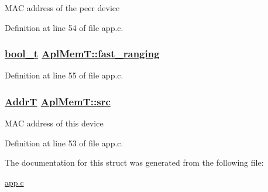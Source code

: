 MAC address of the peer device 

Definition at line 54 of file app.c.\hypertarget{structAplMemT_5d70a5712537b9865b5f0820e4f856b8}{
\subsubsection[fast\_\-ranging]{\setlength{\rightskip}{0pt plus 5cm}\hyperlink{ntrxtypes_8h_04dd5074964518403bf944f2b240a5f8}{bool\_\-t} \hyperlink{structAplMemT_5d70a5712537b9865b5f0820e4f856b8}{Apl\-Mem\-T::fast\_\-ranging}}}
\label{structAplMemT_5d70a5712537b9865b5f0820e4f856b8}




Definition at line 55 of file app.c.\hypertarget{structAplMemT_df06b4a705d3ec9ebaf7a9cb2d3c3fff}{
\subsubsection[src]{\setlength{\rightskip}{0pt plus 5cm}\hyperlink{ntrxtypes_8h_9763ea343e88d0129a49347a4b2ff676}{Addr\-T} \hyperlink{structAplMemT_df06b4a705d3ec9ebaf7a9cb2d3c3fff}{Apl\-Mem\-T::src}}}
\label{structAplMemT_df06b4a705d3ec9ebaf7a9cb2d3c3fff}


MAC address of this device 

Definition at line 53 of file app.c.

The documentation for this struct was generated from the following file:\begin{CompactItemize}
\item 
\hyperlink{app_8c}{app.c}\end{CompactItemize}

